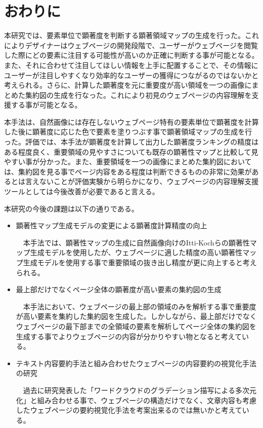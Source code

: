 \newpage
\renewcommand{\baselinestretch}{1.5}
\section{おわりに}
\renewcommand{\baselinestretch}{1}
\par 本研究では、要素単位で顕著度を判断する顕著領域マップの生成を行った。これによりデザイナーはウェブページの開発段階で、ユーザーがウェブページを閲覧した際にどの要素に注目する可能性が高いのか正確に判断する事が可能となる。また、それに合わせて注目してほしい情報を上手に配置することで、その情報にユーザーが注目しやすくなり効率的なユーザーの獲得につながるのではないかと考えられる。さらに、計算した顕著度を元に重要度が高い領域を一つの画像にまとめた集約図の生成を行なった。これにより初見のウェブページの内容理解を支援する事が可能となる。


\par 本手法は、自然画像には存在しないウェブページ特有の要素単位で顕著度を計算した後に顕著度に応じた色で要素を塗りつぶす事で顕著領域マップの生成を行った。評価では、本手法が顕著度を計算して出力した顕著度ランキングの精度はある程度良く、重要領域の見やすさについても既存の顕著性マップと比較して見やすい事が分かった。また、重要領域を一つの画像にまとめた集約図においては、集約図を見る事でページ内容をある程度は判断できるものの非常に効果があるとは言えないことが評価実験から明らかになり、ウェブページの内容理解支援ツールとしては今後改善が必要であると言える。\\


\par 本研究の今後の課題は以下の通りである。

\begin{itemize}
    \item 顕著性マップ生成モデルの変更による顕著度計算精度の向上
    \par ~~本手法では、顕著性マップの生成に自然画像向けのItti-Kochらの顕著性マップ生成モデルを使用したが、ウェブページに適した精度の高い顕著性マップ生成モデルを使用する事で重要領域の抜き出し精度が更に向上すると考えられる。 \\

    \item 最上部だけでなくページ全体の顕著度が高い要素の集約図の生成
    \par ~~本手法において、ウェブページの最上部の領域のみを解析する事で重要度が高い要素を集約した集約図を生成した。しかしながら、最上部だけでなくウェブページの最下部までの全領域の要素を解析してページ全体の集約図を生成する事でよりウェブページの内容が分かりやすい物となると考えている。 \\

    \item テキスト内容要約手法と組み合わせたウェブページの内容要約の視覚化手法の研究
    \par ~~過去に研究発表した「ワードクラウドのグラデーション描写による多次元化」\cite{inagaki2018}と組み合わせる事で、ウェブページの構造だけでなく、文章内容も考慮したウェブページの要約視覚化手法を考案出来るのでは無いかと考えている。 \\
\end{itemize}